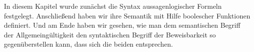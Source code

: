 In diesem Kapitel wurde zunächst die Syntax aussagenlogischer Formeln
festgelegt.
%
Anschließend haben wir ihre Semantik mit Hilfe boolescher Funktionen
definiert.
%
Und am Ende haben wir gesehen, wie man dem semantischen Begriff der
Allgemeingültigkeit den syntaktischen Begriff der Beweisbarkeit so
gegenüberstellen kann, dass sich die beiden entsprechen.

\printunitbibliography

\cleardoublepage










